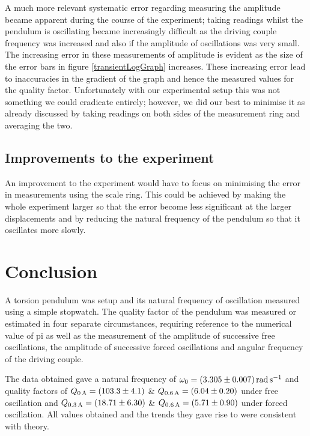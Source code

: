 \documentclass[12pt]{article}
\begin{document}
A much more relevant systematic error regarding measuring the amplitude became apparent during the course of the experiment; taking readings whilst the pendulum is oscillating became increasingly difficult as the driving couple frequency was increased and also if the amplitude of oscillations was very small. The increasing error in these measurements of amplitude is evident as the size of the error bars in figure \ref{transientLogGraph} increases. These increasing error lead to inaccuracies in the gradient of the graph and hence the measured values for the quality factor. Unfortunately with our experimental setup this was not something we could eradicate entirely; however, we did our best to minimise it as already discussed by taking readings on both sides of the measurement ring and averaging the two.

\subsection{Improvements to the experiment}
An improvement to the experiment would have to focus on minimising the error in measurements using the scale ring. This could be achieved by making the whole experiment larger so that the error become less significant at the larger displacements and by reducing the natural frequency of the pendulum so that it oscillates more slowly.

\section{Conclusion}
A torsion pendulum was setup and its natural frequency of oscillation measured using a simple stopwatch. The quality factor of the pendulum was measured or estimated in four separate circumstances, requiring reference to the numerical value of pi as well as the measurement of the amplitude of successive free oscillations, the amplitude of successive forced oscillations and angular frequency of the driving couple.

The data obtained gave a natural frequency of $\omega_0 = \SI{3.305 \pm 0.007}{\radian\per\second}$ and quality factors of $Q_{\SI{0}{\ampere}} = \SI{103.3 \pm 4.1}{}$ \& $Q_{\SI{0.6}{\ampere}} = \SI{6.04 \pm 0.20}{}$ under free oscillation and $Q_{\SI{0.3}{\ampere}} = \SI{18.71 \pm 6.3}{}$ \& $Q_{\SI{0.6}{\ampere}} = \SI{5.71 \pm 0.9}{}$ under forced oscillation. All values obtained and the trends they gave rise to were consistent with theory.




\end{document}
